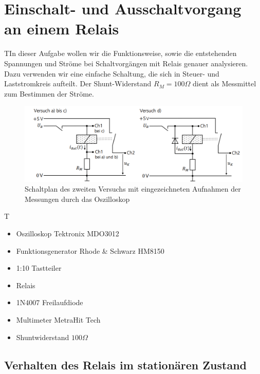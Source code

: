\documentclass{article}
\begin{document}
\newpage


\section{Einschalt- und Ausschaltvorgang an einem Relais}

\begin{task}
    TIn dieser Aufgabe wollen wir die Funktionsweise, sowie die entstehenden Spannungen und Ströme bei Schaltvorgängen mit Relais
    genauer analysieren. Dazu verwenden wir eine einfache Schaltung, die sich in Steuer- und Laststromkreis aufteilt. Der Shunt-Widerstand $R_M = 100\Omega$ dient als Messmittel
    zum Bestimmen der Ströme.
\end{task}
\begin{figure}[h]
    \begin{center}
        \includegraphics[scale=0.8]{../assets/images/ET2P4/Schaltplan2.PNG}
        \caption{Schaltplan des zweiten Versuchs mit eingezeichneten Aufnahmen der Messungen durch das Oszilloskop}
    \end{center}
\end{figure}



\begin{devlist}
    T\begin{itemize}
        \item Oszilloskop Tektronix MDO3012
        \item Funktionsgenerator Rhode \& Schwarz HM8150
        \item 1:10 Tastteiler
        \item Relais
        \item 1N4007 Freilaufdiode
        \item Multimeter MetraHit Tech
        \item Shuntwiderstand $100\Omega$
    \end{itemize}
\end{devlist}


\subsection{Verhalten des Relais im stationären Zustand}
\end{document}
